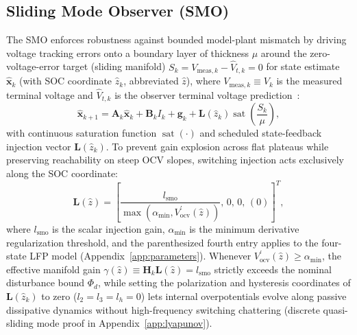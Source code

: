 \documentclass[10pt,a4paper]{article}
\begin{document}
\subsection{Sliding Mode Observer (SMO)}
The SMO enforces robustness against bounded model-plant mismatch by driving voltage tracking errors onto a boundary layer of thickness $\mu$ around the zero-voltage-error target (sliding manifold) $S_k = V_{\text{meas},k} - \hat{V}_{t,k} = 0$ for state estimate $\hat{\mathbf{x}}_k$ (with SOC coordinate $\hat{z}_k$, abbreviated $\hat{z}$), where $V_{\text{meas},k} \equiv V_k$ is the measured terminal voltage and $\hat{V}_{t,k}$ is the observer terminal voltage prediction~\cite{Chen2016smo,Huangfu2018smo}:
\begin{equation}\label{eqn:smo_state_eq}
\hat{\mathbf{x}}_{k+1} = \mathbf{A}_k \hat{\mathbf{x}}_k + \mathbf{B}_k I_k + \mathbf{g}_k + \mathbf{L}(\hat{z}_k) \operatorname{sat}\left( \frac{S_k}{\mu} \right),
\end{equation}
with continuous saturation function $\operatorname{sat}(\cdot)$ and scheduled state-feedback injection vector $\mathbf{L}(\hat{z}_k)$. To prevent gain explosion across flat plateaus while preserving reachability on steep OCV slopes, switching injection acts exclusively along the SOC coordinate:
\begin{equation}
\mathbf{L}(\hat{z}) = \left[\frac{l_{\text{smo}}}{\max(\alpha_{\min}, V_{\text{ocv}}^\prime(\hat{z}))},\, 0,\, 0,\, (0)\right]^T,
\end{equation}
where $l_{\text{smo}}$ is the scalar injection gain, $\alpha_{\min}$ is the minimum derivative regularization threshold, and the parenthesized fourth entry applies to the four-state LFP model (Appendix~\ref{app:parameters}). Whenever $V_{\text{ocv}}^\prime(\hat{z}) \ge \alpha_{\min}$, the effective manifold gain $\gamma(\hat{z}) \equiv \mathbf{H}_k\mathbf{L}(\hat{z}) = l_{\text{smo}}$ strictly exceeds the nominal disturbance bound $\Phi_d$, while setting the polarization and hysteresis coordinates of $\mathbf{L}(\hat{z}_k)$ to zero ($l_2 = l_3 = l_h = 0$) lets internal overpotentials evolve along passive dissipative dynamics without high-frequency switching chattering (discrete quasi-sliding mode proof in Appendix~\ref{app:lyapunov}).
\end{document}
